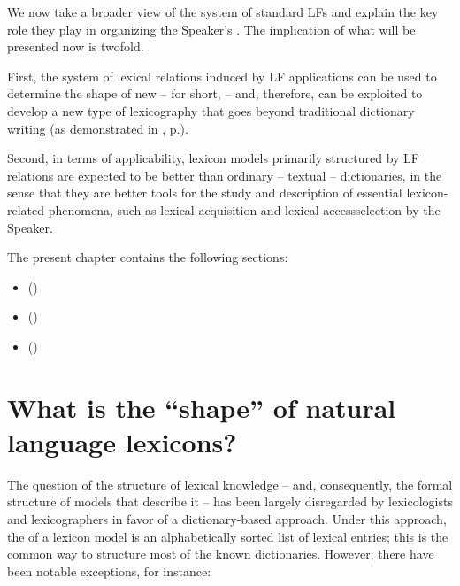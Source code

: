 We now take a broader view of the system of standard LFs and explain the key role they play in organizing the Speaker's . The implication of what will be presented now is twofold.

First, the system of lexical relations induced by LF applications can be used to determine the shape of new  -- for short,  -- and, therefore, can be exploited to develop a new type of lexicography that goes beyond traditional dictionary writing (as demonstrated in , p.\thinspace\pageref{sec:fr-LN}).

Second, in terms of applicability, lexicon models primarily structured by LF relations are expected to be better  than ordinary -- textual -- dictionaries, in the sense that they are better tools for the study and description of essential lexicon-related phenomena, such as lexical acquisition and lexical access\slashs{}selection by the Speaker.

The present chapter contains the following sections:

\begin{itemize}

\item {} ()

\item {} ()

\item {} ()

\end{itemize}


\section{What is the ``shape'' of natural language lexicons?}\label{sec:shapeOfLexicons}

The question of the structure of lexical knowledge -- and, consequently, the formal structure of models that describe it -- has been largely disregarded by lexicologists and lexicographers in favor of a dictionary-based approach. Under this approach, the  \parencite{Wiegand1996} of a lexicon model is an alphabetically sorted list of lexical entries; this is the common way to structure most of the known dictionaries. However, there have been notable exceptions, for instance:

